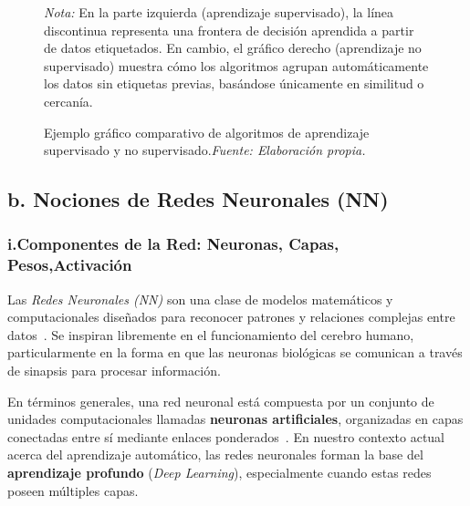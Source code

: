 \documentclass[11pt]{article} %
\begin{document}
\begin{figure}[H]

\caption{Ejemplo gráfico comparativo de algoritmos de aprendizaje supervisado y no supervisado.\textit{Fuente: Elaboración propia.}}
\label{fig:aprendizaje-supervisado-no-supervisado}
\vspace{2mm}

\small\textit{Nota:} En la parte izquierda (aprendizaje supervisado), la línea discontinua representa una frontera de decisión aprendida a partir de datos etiquetados. En cambio, el gráfico derecho (aprendizaje no supervisado) muestra cómo los algoritmos agrupan automáticamente los datos sin etiquetas previas, basándose únicamente en similitud o cercanía.

\end{figure}
\subsection{b. Nociones de Redes Neuronales (NN)}
\vspace{5pt}

\subsubsection{i.Componentes de la Red: Neuronas, Capas, Pesos,Activación} 
\vspace{3pt}
Las \textit{Redes Neuronales (NN)} son una clase de modelos matemáticos y computacionales diseñados para reconocer patrones y relaciones complejas entre datos~\cite{sanchez}. Se inspiran libremente en el funcionamiento del cerebro humano, particularmente en la forma en que las neuronas biológicas se comunican a través de sinapsis para procesar información.

En términos generales, una red neuronal está compuesta por un conjunto de unidades computacionales llamadas \textbf{neuronas artificiales}, organizadas en capas conectadas entre sí mediante enlaces ponderados~\cite{elementosIA}. En nuestro contexto actual acerca del aprendizaje automático, las redes neuronales forman la base del \textbf{aprendizaje profundo} (\textit{Deep Learning}), especialmente cuando estas redes poseen múltiples capas.
\end{document}
